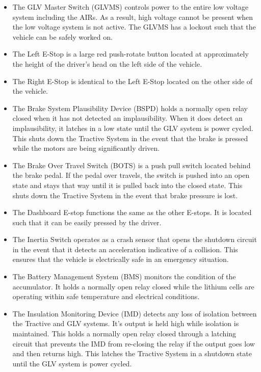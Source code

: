 \documentclass{article}
\begin{document}
	\begin{itemize}
		\item The GLV Master Switch (GLVMS) controls power to the entire low voltage system including the AIRs. As a result, high voltage cannot be present when the low voltage system is not active. The GLVMS has a lockout such that the vehicle can be safely worked on. 
		\item The Left E-Stop is a large red push-rotate button located at approximately the height of the driver's head on the left side of the vehicle. 
		\item The Right E-Stop is identical to the Left E-Stop located on the other side of the vehicle. 
		\item The Brake System Plausibility Device (BSPD) holds a normally open relay closed when it has not detected an implausibility. When it does detect an implausibility, it latches in a low state until the GLV system is power cycled. This shuts down the Tractive System in the event that the brake is pressed while the motors are being significantly driven.  
		\item The Brake Over Travel Switch (BOTS) is a push pull switch located behind the brake pedal. If the pedal over travels, the switch is pushed into an open state and stays that way until it is pulled back into the closed state. This shuts down the Tractive System in the event that brake pressure is lost. 
		\item The Dashboard E-stop functions the same as the other E-stops. It is located such that it can be easily pressed by the driver. 
		\item The Inertia Switch operates as a crash sensor that opens the shutdown circuit in the event that it detects an acceleration indicative of a collision. This ensures that the vehicle is electrically safe in an emergency situation. 
		\item The Battery Management System (BMS) monitors the condition of the accumulator. It holds a normally open relay closed while the lithium cells are operating within safe temperature and electrical conditions. 
		\item The Insulation Monitoring Device (IMD) detects any loss of isolation between the Tractive and GLV systems. It's output is held high while isolation is maintained. This holds a normally open relay closed through a latching circuit that prevents the IMD from re-closing the relay if the output goes low and then returns high. This latches the Tractive System in a shutdown state until the GLV system is power cycled. 

\end{itemize}
\end{document}

